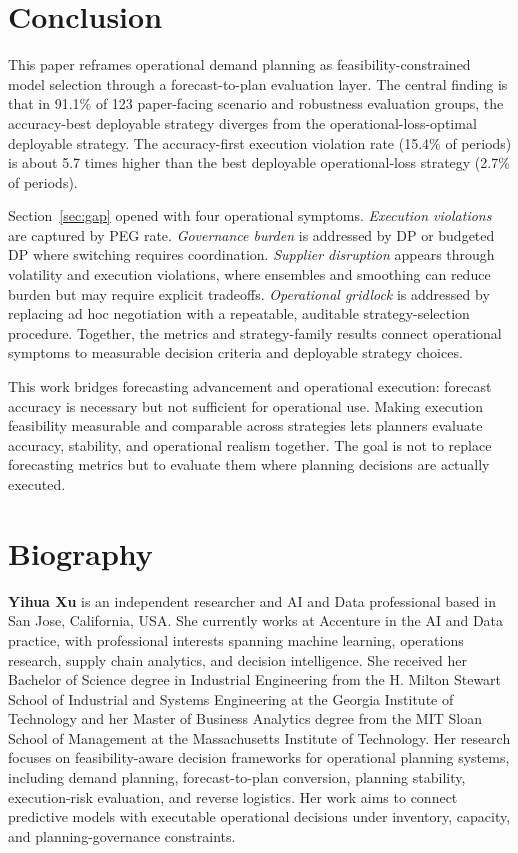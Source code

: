 \section{Conclusion}

This paper reframes operational demand planning as feasibility-constrained model selection through a forecast-to-plan evaluation layer. The central finding is that in 91.1\% of 123 paper-facing scenario and robustness evaluation groups, the accuracy-best deployable strategy diverges from the operational-loss-optimal deployable strategy. The accuracy-first execution violation rate (15.4\% of periods) is about 5.7 times higher than the best deployable operational-loss strategy (2.7\% of periods).

Section~\ref{sec:gap} opened with four operational symptoms. \emph{Execution violations} are captured by PEG rate. \emph{Governance burden} is addressed by DP or budgeted DP where switching requires coordination. \emph{Supplier disruption} appears through volatility and execution violations, where ensembles and smoothing can reduce burden but may require explicit tradeoffs. \emph{Operational gridlock} is addressed by replacing ad hoc negotiation with a repeatable, auditable strategy-selection procedure. Together, the metrics and strategy-family results connect operational symptoms to measurable decision criteria and deployable strategy choices.

This work bridges forecasting advancement and operational execution: forecast accuracy is necessary but not sufficient for operational use. Making execution feasibility measurable and comparable across strategies lets planners evaluate accuracy, stability, and operational realism together. The goal is not to replace forecasting metrics but to evaluate them where planning decisions are actually executed.

\section*{Biography}

\textbf{Yihua Xu} is an independent researcher and AI and Data professional based in San Jose, California, USA. She currently works at Accenture in the AI and Data practice, with professional interests spanning machine learning, operations research, supply chain analytics, and decision intelligence. She received her Bachelor of Science degree in Industrial Engineering from the H. Milton Stewart School of Industrial and Systems Engineering at the Georgia Institute of Technology and her Master of Business Analytics degree from the MIT Sloan School of Management at the Massachusetts Institute of Technology. Her research focuses on feasibility-aware decision frameworks for operational planning systems, including demand planning, forecast-to-plan conversion, planning stability, execution-risk evaluation, and reverse logistics. Her work aims to connect predictive models with executable operational decisions under inventory, capacity, and planning-governance constraints.
